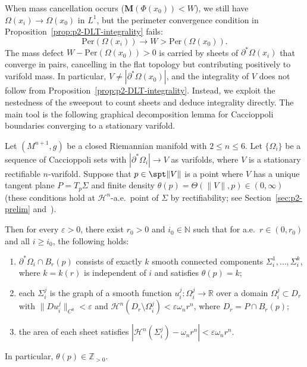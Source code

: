 When mass cancellation occurs ($\mathbf{M}(\Phi(x_0)) < W$), we still have $\Omega(x_i) \to \Omega(x_0)$ in $L^1$, but the perimeter convergence condition in Proposition~\ref{prop:p2-DLT-integrality} fails:
\[
    \mathrm{Per}(\Omega(x_i)) \to W > \mathrm{Per}(\Omega(x_0)).
\]
The mass defect $W - \mathrm{Per}(\Omega(x_0)) > 0$ is carried by sheets of $\partial^*\Omega(x_i)$ that converge in pairs, cancelling in the flat topology but contributing positively to varifold mass. In particular, $V \neq |\partial^*\Omega(x_0)|$, and the integrality of $V$ does not follow from Proposition~\ref{prop:p2-DLT-integrality}. Instead, we exploit the nestedness of the sweepout to count sheets and deduce integrality directly. The main tool is the following graphical decomposition lemma for Caccioppoli boundaries converging to a stationary varifold.

\begin{lemma}\label{lem:sheet-decomposition}
Let $(M^{n+1}, g)$ be a closed Riemannian manifold with $2 \leq n \leq 6$. Let $\{\Omega_i\}$ be a sequence of Caccioppoli sets with $|\partial^*\Omega_i| \to V$ as varifolds, where $V$ is a stationary rectifiable $n$-varifold. Suppose that $p \in \spt\|V\|$ is a point where $V$ has a unique tangent plane $P = T_p\Sigma$ and finite density $\theta(p) = \Theta(\|V\|, p) \in (0, \infty)$ (these conditions hold at $\mathcal{H}^n$-a.e.\ point of $\Sigma$ by rectifiability; see Section~\ref{sec:p2-prelim} and~\cite[Section~11]{Sim84}).

Then for every $\varepsilon > 0$, there exist $r_0 > 0$ and $i_0 \in \mathbb{N}$ such that for a.e.\ $r \in (0, r_0)$ and all $i \geq i_0$, the following holds:
\begin{enumerate}[label=\textup{(\roman*)}]
    \item $\partial^*\Omega_i \cap B_r(p)$ consists of exactly $k$ smooth connected components $\Sigma_i^1, \ldots, \Sigma_i^k$, where $k = k(r)$ is independent of $i$ and satisfies $\theta(p) = k$;
    \item each $\Sigma_i^j$ is the graph of a smooth function $u_i^j \colon \Omega_i^j \to \mathbb{R}$ over a domain $\Omega_i^j \subset D_r$ with $\|Du_i^j\|_{C^0} < \varepsilon$ and $\mathcal{H}^n(D_r \setminus \Omega_i^j) < \varepsilon \omega_n r^n$, where $D_r = P \cap B_r(p)$;
    \item the area of each sheet satisfies $|\mathcal{H}^n(\Sigma_i^j) - \omega_n r^n| < \varepsilon \omega_n r^n$.
\end{enumerate}
In particular, $\theta(p) \in \mathbb{Z}_{>0}$.
\end{lemma}

